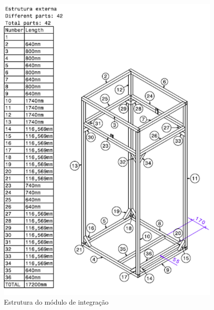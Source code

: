 \begin{anexosenv}
\begin{figure}[!ht]
	\centering
		\includegraphics[scale=0.6]{figuras/estrutura/anexos/19.png}
	\caption{Estrutura do módulo de integração}
\end{figure}


\end{anexosenv}
